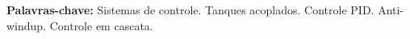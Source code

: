 \documentclass[a4paper,12pt]{article}
\begin{document}
\vspace{\baselineskip}

\noindent\textbf{Palavras-chave:} Sistemas de controle. Tanques acoplados. Controle PID. Anti-windup. Controle em cascata.

\newpage


%
%
%
%


%
%
%
%
\end{document}

